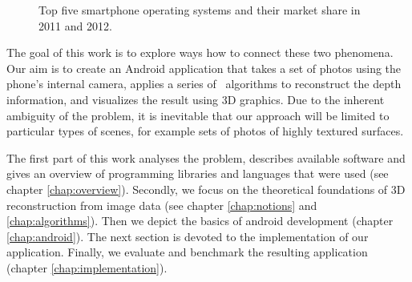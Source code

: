 \begin{figure}[h]
  \caption{Top five smartphone operating systems and their market share in 2011 and 2012.}
  \label{fig:market_share}
\end{figure}

The goal of this work is to explore ways how to connect these two phenomena. 
Our aim is to create an Android application that takes a set of photos using the phone's internal camera, applies a series of \cv\ algorithms to reconstruct the depth information, and visualizes the result using 3D graphics. 
Due to the inherent ambiguity of the problem, it is inevitable that our approach will be limited to particular types of scenes, for example sets of photos of highly textured surfaces. 

The first part of this work analyses the problem, describes available software and gives an overview of programming libraries and languages that were used (see chapter \ref{chap:overview}). 
Secondly, we focus on the theoretical foundations of 3D reconstruction from image data (see chapter \ref{chap:notions} and \ref{chap:algorithms}). 
Then we depict the basics of android development (chapter \ref{chap:android}).
The next section is devoted to the implementation of our application.
Finally, we evaluate and benchmark the resulting application (chapter \ref{chap:implementation}).


